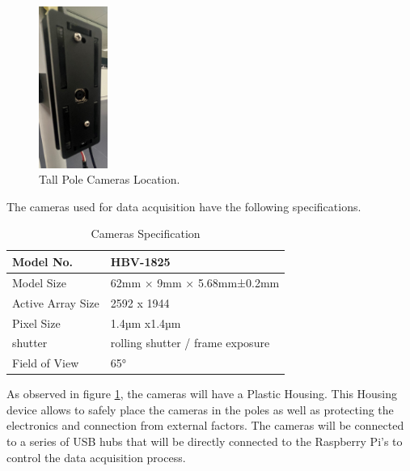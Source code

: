 \documentclass[12pt]{report}
\begin{document}
 
\begin{figure}
  \begin{center}
    \includegraphics[width=0.2\textwidth]{IMG_5885_cropped.jpg}
  \end{center}
  \caption{Tall Pole Cameras Location.}
  \label{fig:Cameras}
\end{figure}

The cameras used for data acquisition have the following specifications. 
\begin{table}[H]
  \begin{tabular}{|l|l|}
  \hline
  Model No.         & HBV-1825                         \\ \hline
  Model Size        & 62mm × 9mm × 5.68mm±0.2mm        \\ \hline
  Active Array Size & 2592 x 1944                      \\ \hline
  Pixel Size        & 1.4µm x1.4µm                     \\ \hline
  shutter           & rolling shutter / frame exposure \\ \hline
  Field of View     & 65°                              \\ \hline
  \end{tabular}
  \captionsetup{singlelinecheck = false, format= hang, justification=raggedright, font=footnotesize, labelsep=space}
  \caption{Cameras Specification}
  \label{tab:Cameras_specs}
\end{table}

As observed in figure \ref{fig:Cameras}, the cameras will have a Plastic Housing. This Housing device allows to safely place the cameras 
in the poles as well as protecting the electronics and connection from external factors.
The cameras will be connected to a series of USB hubs that will be directly connected to the Raspberry Pi's to control the data acquisition process.
\end{document}
